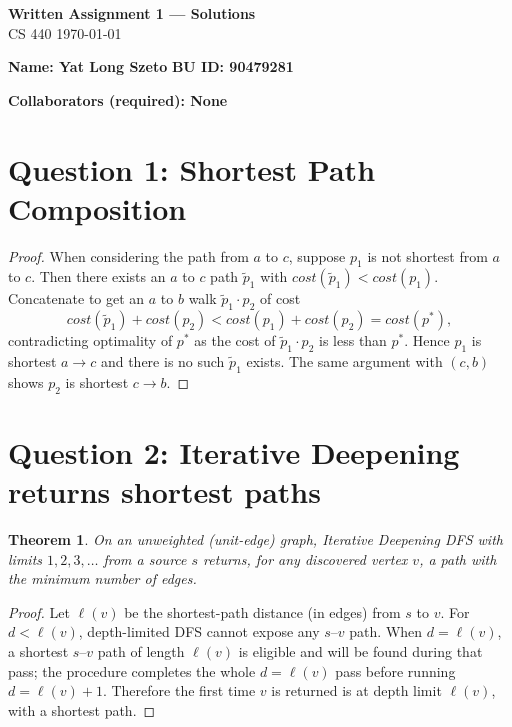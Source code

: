 \documentclass[11pt]{article}
\newtheorem{theorem}{Theorem}
\theoremstyle{definition}
\theoremstyle{remark}
\begin{document}
\begin{center}
{\Large \textbf{Written Assignment 1 — Solutions}}\\[0.25em]
CS 440 \quad \today
\end{center}

\noindent\textbf{Name: Yat Long Szeto} \quad
\textbf{BU ID:  90479281} 

\medskip
\noindent\textbf{Collaborators (required): None}

\bigskip

\section*{Question 1: Shortest Path Composition}

\begin{proof}
When considering the path from $a$ to $c$,
suppose $p_1$ is not shortest from $a$ to $c$. 
Then there exists an $a$ to $c$ path $\tilde p_1$ with $cost(\tilde p_1) < cost(p_1)$. 
Concatenate to get an $a$ to $b$ walk $\tilde p_1\cdot p_2$ of cost
\[
cost(\tilde p_1)+cost(p_2) < cost(p_1)+cost(p_2)=cost(p^\ast),
\]
contradicting optimality of $p^\ast$ as the cost of $\tilde p_1\cdot p_2$ is less than $p^\ast$.
 Hence $p_1$ is shortest $a\!\to\! c$ and there is no such $\tilde p_1$ exists.
 The same argument with $(c,b)$ shows $p_2$ is shortest $c\!\to\! b$.
\end{proof}

\section*{Question 2: Iterative Deepening returns shortest paths}
\begin{theorem}
On an unweighted (unit-edge) graph, Iterative Deepening DFS with limits $1,2,3,\dots$ from a source $s$ returns, for any discovered vertex $v$, a path with the minimum number of edges.
\end{theorem}

\begin{proof}
Let $\ell(v)$ be the shortest-path distance (in edges) from $s$ to $v$. For $d<\ell(v)$, depth-limited DFS cannot expose any $s$–$v$ path. When $d=\ell(v)$, a shortest $s$–$v$ path of length $\ell(v)$ is eligible and will be found during that pass; the procedure completes the whole $d=\ell(v)$ pass before running $d=\ell(v){+}1$. Therefore the first time $v$ is returned is at depth limit $\ell(v)$, with a shortest path.
\end{proof}
\end{document}
